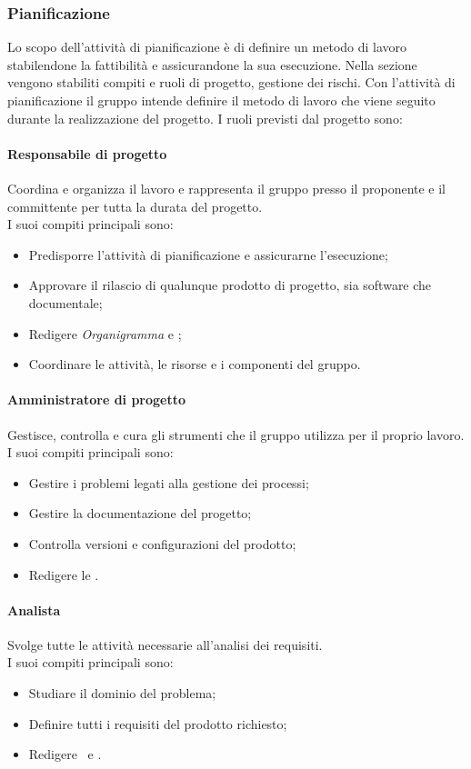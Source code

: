 \subsubsection{Pianificazione}
Lo scopo dell'attività di pianificazione è di definire un metodo di lavoro stabilendone la fattibilità e assicurandone la sua esecuzione.
Nella sezione vengono stabiliti compiti e ruoli di progetto, gestione dei rischi. 
Con l'attività di pianificazione il gruppo intende definire il metodo di lavoro che viene seguito durante la realizzazione del progetto.
I ruoli previsti dal progetto sono:
\paragraph*{Responsabile di progetto}
Coordina e organizza il lavoro e rappresenta il gruppo presso il proponente e il committente per tutta la durata del progetto. \\
I suoi compiti principali sono:
\begin{itemize}
	\item Predisporre l'attività di pianificazione e assicurarne l'esecuzione;
	\item Approvare il rilascio di qualunque prodotto di progetto, sia software che documentale;
	\item Redigere \textit{Organigramma} e \PdPv;
	\item Coordinare le attività, le risorse e i componenti del gruppo.
\end{itemize}

\paragraph*{Amministratore di progetto}
Gestisce, controlla e cura gli strumenti che il gruppo utilizza per il proprio lavoro.\\
I suoi compiti principali sono:
\begin{itemize}
	\item Gestire i problemi legati alla gestione dei processi;
	\item Gestire la documentazione del progetto;
	\item Controlla versioni e configurazioni del prodotto;
	\item Redigere le \NdPv.
\end{itemize}

\paragraph*{Analista}
Svolge tutte le attività necessarie all'analisi dei requisiti.\\
I suoi compiti principali sono:
\begin{itemize}
	\item Studiare il dominio del problema;
	\item Definire tutti i requisiti del prodotto richiesto;
	\item Redigere \SdFv\ e \AdRv.
\end{itemize}

